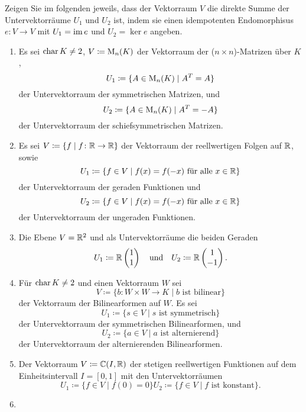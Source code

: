 \documentclass[a4paper,10pt]{scrartcl}
\begin{document}
\begin{question}
  Zeigen Sie im folgenden jeweils, dass der Vektorraum $V$ die direkte Summe der Untervektorräume $U_1$ und $U_2$ ist, indem sie einen idempotenten Endomorphisus $e \colon V \to V$ mit $U_1 = \operatorname{im} e$ und $U_2 = \ker e$ angeben.
  \begin{enumerate}[leftmargin=*]
    \item
      Es sei $\operatorname{char} K \neq 2$, $V \coloneqq \operatorname{M}_n(K)$ der Vektorraum der ($n \times n$)-Matrizen über $K$,
      \[
        U_1 \coloneqq \{ A \in \operatorname{M}_n(K) \mid A^T = A \}
      \]
      der Untervektorraum der symmetrischen Matrizen, und
      \[
        U_2 \coloneqq \{ A \in \operatorname{M}_n(K) \mid A^T = -A \}
      \]
      der Untervektorraum der schiefsymmetrischen Matrizen.
    \item
      Es sei $V \coloneqq \{ f \mid f \colon \mathbb{R} \to \mathbb{R} \}$ der Vektorraum der reellwertigen Folgen auf $\mathbb{R}$, sowie
      \[
        U_1 \coloneqq \{ f \in V \mid \text{$f(x) = f(-x)$ für alle $x \in \mathbb{R}$} \}
      \]
      der Untervektorraum der geraden Funktionen und
      \[
        U_2 \coloneqq \{ f \in V \mid \text{$f(x) = f(-x)$ für alle $x \in \mathbb{R}$} \}
      \]
      der Untervektorraum der ungeraden Funktionen.
    \item
      Die Ebene $V = \mathbb{R}^2$ und als Untervektorräume die beiden Geraden
      \[
        U_1 \coloneqq \mathbb{R} \begin{pmatrix} 1 \\  1 \end{pmatrix}
        \quad\text{und}\quad
        U_2 \coloneqq \mathbb{R} \begin{pmatrix} 1 \\ -1 \end{pmatrix}.
      \]
    \item
      Für $\operatorname{char} K \neq 2$ und einen Vektorraum $W$ sei
      \[
                  V
        \coloneqq \{b \colon W \times W \to K \mid \text{$b$ ist bilinear}\}
      \]
      der Vektorraum der Bilinearformen auf $W$.
      Es sei
      \[
                  U_1
        \coloneqq \{ s \in V \mid \text{$s$ ist symmetrisch} \}
      \]
      der Untervektorraum der symmetrischen Bilinearformen, und
      \[
                  U_2
        \coloneqq \{ a \in V \mid \text{$a$ ist alternierend} \}
      \]
      der Untervektorraum der alternierenden Bilinearformen.
    \item
      Der Vektorraum $V \coloneqq \mathbb{C}(I, \mathbb{R})$ der stetigen reellwertigen Funktionen auf dem Einheitsintervall $I = [0,1]$ mit den Untervektorräumen
      \[
        U_1 \coloneqq \{f \in V \mid f(0) = 0\}
        U_2 \coloneqq \{f \in V \mid \text{$f$ ist konstant}\}.
      \]
    \item

\end{enumerate}
\end{question}
\end{document}
